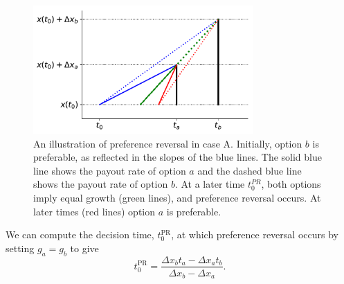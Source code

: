 \documentclass[11pt]{article}
\newcommand{\flabel}[1]{\label{fig:#1}}
\newcommand{\be}{\begin{equation}}
\newcommand{\ee}{\end{equation}}
\newcommand{\Dt}{\Delta t}
\newcommand{\Dx}{\Delta x}
\numberwithin{equation}{section}
\begin{document}
\begin{figure}[!htb]
\centering
\includegraphics[width=0.75\textwidth]{./figures/reversal.pdf}
\caption{
An illustration of preference reversal in case A. Initially, option $b$ is preferable, as reflected in the slopes of the blue lines. The solid blue line shows the payout rate of option $a$ and the dashed blue line shows the payout rate of option $b$. At a later time $t_0^{PR}$, both options imply equal growth (green lines), and preference reversal occurs. At later times (red lines) option $a$ is preferable. 
}
\flabel{caseA}
\end{figure}


We can compute the decision time, $t_0^\text{PR}$, at which preference reversal occurs by setting $g_a=g_b$ to give
\be
t_0^\text{PR} = \frac{\Dx_b t_a - \Dx_a t_b}{\Dx_b - \Dx_a}.
\ee
\end{document}
